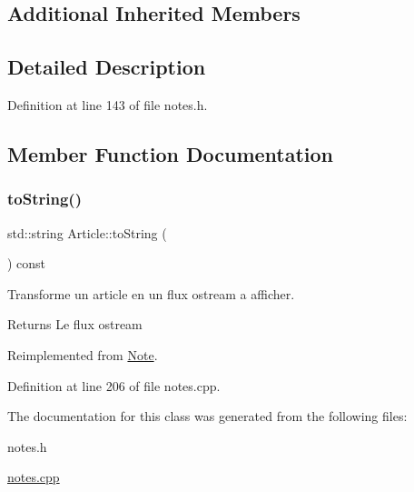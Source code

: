 \subsection*{Additional Inherited Members}


\subsection{Detailed Description}


Definition at line 143 of file notes.\+h.



\subsection{Member Function Documentation}
\mbox{\label{class_article_ae40d268ecffbaaa549968a81ea609ba4}} 
\subsubsection{\texorpdfstring{to\+String()}{toString()}}
{\footnotesize\ttfamily std\+::string Article\+::to\+String (\begin{DoxyParamCaption}{ }\end{DoxyParamCaption}) const\hspace{0.3cm}{\ttfamily [virtual]}}



Transforme un article en un flux ostream a afficher. 

\begin{DoxyReturn}{Returns}
Le flux ostream 
\end{DoxyReturn}


Reimplemented from \hyperlink{class_note_a1bd4acfbde0b71d05fd7d4ca889bca2b}{Note}.



Definition at line 206 of file notes.\+cpp.



The documentation for this class was generated from the following files\+:\begin{DoxyCompactItemize}
\item 
notes.\+h\item 
\hyperlink{notes_8cpp}{notes.\+cpp}\end{DoxyCompactItemize}
